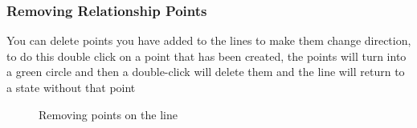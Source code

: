 \documentclass[a4paper]{article}
\begin{document}
{\subsubsection{Removing Relationship Points}
You can delete points you have added to the lines to make them change direction, to do this double click on a point that has been created, the points will turn into a green circle and then a double-click will delete them and the line will return to a state without that point
\vspace{-5pt}
\begin{figure}[H]
\begin{center}
 \imagespace
{}
\vspace{-5pt}
\caption{Removing points on the line}
\end{center}
\end{figure}\vspace{-30pt}


}
\end{document}
